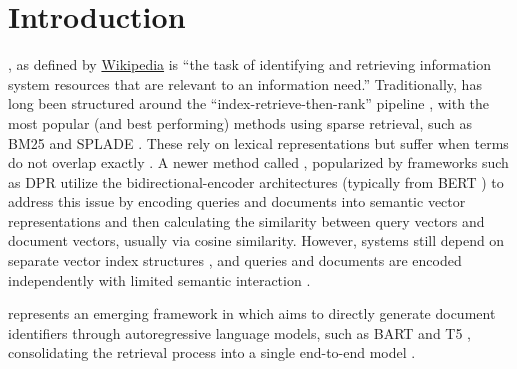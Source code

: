 
\newcommand{\adrian}[1]{\textcolor{orange}{#1}}

\section{Introduction}

, as defined by \href{https://en.wikipedia.org/wiki/Information_retrieval}{Wikipedia} is ``the task of identifying and retrieving information system resources that are relevant to an information need.'' Traditionally,  has long been structured around the ``index-retrieve-then-rank'' pipeline \cite{tang-recent-advances,metzler-rethinking-search}, with the most popular (and best performing) methods using sparse retrieval, such as BM25 \cite{robertson-the-probabilistic} and SPLADE \cite{formal-splade-sparse}. These rely on lexical representations but suffer when terms do not overlap exactly \cite{choi-spade-improving,biplob-biswas-efficient-and,luyu-gao-coil-revisit}. A newer method called , popularized by frameworks such as DPR \cite{vladimir-karpukhin-dense-passage} utilize the bidirectional-encoder architectures (typically from BERT \cite{devlin-bert-pretraining}) to address this issue by encoding queries and documents into semantic vector representations and then calculating the similarity between query vectors and document vectors, usually via cosine similarity. However,  systems still depend on separate vector index structures \cite{lee-xiong-approximate-nearest,haitao-li-constructing-treebased}, and queries and documents are encoded independently with limited semantic interaction \cite{jianmo-ni-large-dual}.

 represents an emerging framework in  which aims to directly generate document identifiers through autoregressive language models, such as BART \cite{lewis-bart-denoising} and T5 \cite{colin-raffel-exploring-the}, consolidating the retrieval process into a single end-to-end model \cite{peitian-zhang-generative-retrieval,xiaoxi-li-from-matching,tzulin-kuo-a-survey}.

